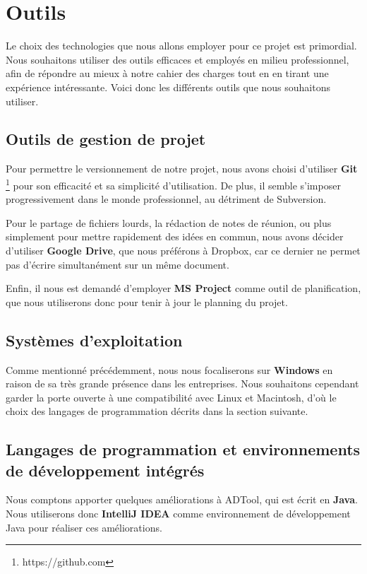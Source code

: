 \section{Outils}
    Le choix des technologies que nous allons employer pour ce projet est primordial. Nous souhaitons utiliser des outils efficaces et employés en milieu professionnel, afin de répondre au mieux à notre cahier des charges tout en en tirant une expérience intéressante. Voici donc les différents outils que nous souhaitons utiliser.
         
    \subsection{Outils de gestion de projet}
        Pour permettre le versionnement de notre projet, nous avons choisi d'utiliser {\bf Git} \footnote{https://github.com} pour son efficacité et sa simplicité d'utilisation. De plus, il semble s'imposer progressivement dans le monde professionnel, au détriment de Subversion.
        
        Pour le partage de fichiers lourds, la rédaction de notes de réunion, ou plus simplement pour mettre rapidement des idées en commun, nous avons décider d'utiliser {\bf Google Drive}, que nous préférons à Dropbox, car ce dernier ne permet pas d'écrire simultanément sur un même document.

        Enfin, il nous est demandé d'employer {\bf MS Project} comme outil de planification, que nous utiliserons donc pour tenir à jour le planning du projet.

	\subsection{Systèmes d'exploitation}
	Comme mentionné précédemment, nous nous focaliserons sur {\bf Windows} en raison de sa très grande présence dans les entreprises. Nous souhaitons cependant garder la porte ouverte à une compatibilité avec Linux et Macintosh, d'où le choix des langages de programmation décrits dans la section suivante.
	
    \subsection{Langages de programmation et environnements de développement intégrés}
        Nous comptons apporter quelques améliorations à ADTool, qui est écrit en {\bf Java}. Nous utiliserons donc {\bf IntelliJ IDEA} comme environnement de développement Java pour réaliser ces améliorations.
           
